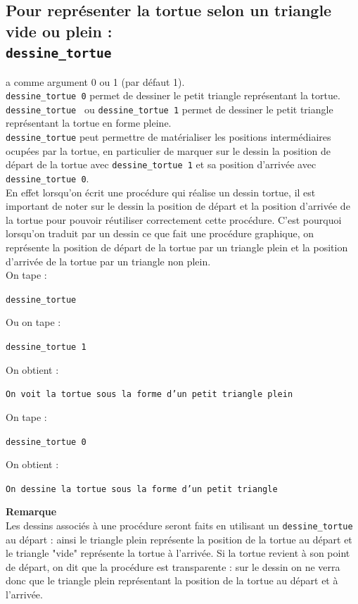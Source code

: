 \documentclass[a4paper,11pt]{book}
\begin{document}
\subsection{Pour repr\'esenter la tortue selon un triangle vide ou plein :\\ {\tt dessine\_tortue}}
 a  comme argument 0 ou 1 (par d\'efaut 1).\\
{\tt dessine\_tortue 0} permet de dessiner le petit triangle repr\'esentant la
tortue.\\
{\tt dessine\_tortue } ou {\tt dessine\_tortue 1} permet de dessiner le petit triangle repr\'esentant la
tortue en forme pleine.\\
{\tt dessine\_tortue} peut permettre de mat\'erialiser les positions 
interm\'ediaires ocup\'ees par la tortue, en particulier de marquer sur le 
dessin la position de d\'epart de la tortue avec {\tt dessine\_tortue 1} et sa 
position d'arriv\'ee avec {\tt dessine\_tortue 0}.\\
En effet lorsqu'on \'ecrit une proc\'edure qui r\'ealise un dessin tortue,
il est important de noter sur le dessin la position de d\'epart et la position
d'arriv\'ee de la tortue pour pouvoir r\'eutiliser correctement cette 
proc\'edure. C'est pourquoi lorsqu'on traduit par un dessin ce que fait une 
proc\'edure graphique, on 
repr\'esente la position de d\'epart de la tortue par un triangle plein et
la position d'arriv\'ee de la tortue  par un triangle non plein.\\
On tape :
\begin{center}{\tt dessine\_tortue}\end{center}
Ou on tape :
\begin{center}{\tt dessine\_tortue 1}\end{center}
On obtient :
\begin{center}{\tt On voit la tortue sous la forme d'un petit triangle plein}\end{center}
On tape :
\begin{center}{\tt dessine\_tortue 0}\end{center}
On obtient :
\begin{center}{\tt On dessine la tortue sous la forme d'un petit triangle}\end{center}{\bf Remarque}\\
Les dessins associ\'es \`a une proc\'edure seront faits en utilisant un 
{\tt dessine\_tortue} au d\'epart : ainsi le triangle plein repr\'esente la
position de la tortue au d\'epart et 
le triangle "vide" repr\'esente la tortue \`a l'arriv\'ee.
Si la tortue revient \`a son point de d\'epart, on dit que la proc\'edure est 
transparente : sur le dessin on ne verra donc que le triangle plein 
repr\'esentant la position de la tortue au d\'epart et \`a l'arriv\'ee.
\end{document}

